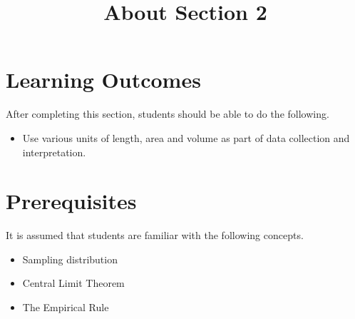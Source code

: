 \documentclass{ximera}
\title{About Section 2}
\begin{document}
\begin{abstract}
\end{abstract}
 
\maketitle
 
\section*{Learning Outcomes}
After completing this section, students should be able to do the following.
 
\begin{itemize}
    \item Use various units of length, area and volume as part of data collection and interpretation.
    
   \end{itemize}

   \section*{Prerequisites}
   It is assumed that students are familiar with the following concepts.
   \begin{itemize}
   \item Sampling distribution
       \item Central Limit Theorem
        \item The Empirical Rule
   \end{itemize}
 
\end{document}
